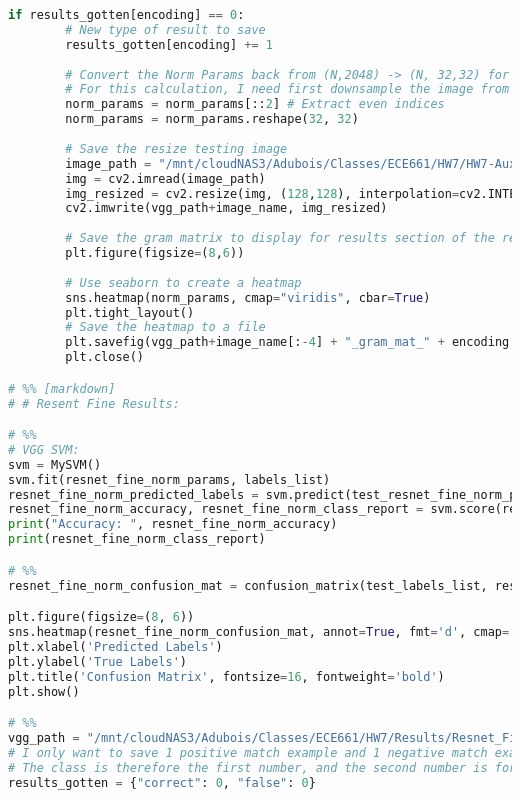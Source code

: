 \documentclass{article}
\begin{document}
\begin{lstlisting}[language=Python]
    if results_gotten[encoding] == 0:
        # New type of result to save
        results_gotten[encoding] += 1
        
        # Convert the Norm Params back from (N,2048) -> (N, 32,32) for display
        # For this calculation, I need first downsample the image from 2048->1024 by taking only the even indices and then I can represent the matrix as (32,32)
        norm_params = norm_params[::2] # Extract even indices
        norm_params = norm_params.reshape(32, 32)
        
        # Save the resize testing image
        image_path = "/mnt/cloudNAS3/Adubois/Classes/ECE661/HW7/HW7-Auxilliary/data/testing/" + image_name
        img = cv2.imread(image_path)
        img_resized = cv2.resize(img, (128,128), interpolation=cv2.INTER_AREA)
        cv2.imwrite(vgg_path+image_name, img_resized)
        
        # Save the gram matrix to display for results section of the report
        plt.figure(figsize=(8,6))
        
        # Use seaborn to create a heatmap
        sns.heatmap(norm_params, cmap="viridis", cbar=True)
        plt.tight_layout()
        # Save the heatmap to a file
        plt.savefig(vgg_path+image_name[:-4] + "_gram_mat_" + encoding + ".png", format='png', dpi=300, bbox_inches="tight")
        plt.close()

# %% [markdown]
# # Resent Fine Results:

# %%
# VGG SVM:
svm = MySVM()
svm.fit(resnet_fine_norm_params, labels_list)
resnet_fine_norm_predicted_labels = svm.predict(test_resnet_fine_norm_params)
resnet_fine_norm_accuracy, resnet_fine_norm_class_report = svm.score(resnet_fine_norm_predicted_labels, test_labels_list)
print("Accuracy: ", resnet_fine_norm_accuracy)
print(resnet_fine_norm_class_report)

# %%
resnet_fine_norm_confusion_mat = confusion_matrix(test_labels_list, resnet_fine_norm_predicted_labels)

plt.figure(figsize=(8, 6))
sns.heatmap(resnet_fine_norm_confusion_mat, annot=True, fmt='d', cmap='Blues', cbar=False)
plt.xlabel('Predicted Labels')
plt.ylabel('True Labels')
plt.title('Confusion Matrix', fontsize=16, fontweight='bold')
plt.show()

# %%
vgg_path = "/mnt/cloudNAS3/Adubois/Classes/ECE661/HW7/Results/Resnet_Fine_Bonus_Results/"
# I only want to save 1 positive match example and 1 negative match example for each class
# The class is therefore the first number, and the second number is for matching labels or not
results_gotten = {"correct": 0, "false": 0}


\end{lstlisting}
\end{document}
